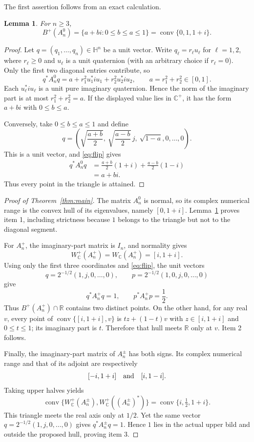 \documentclass[11pt]{article}
\newtheorem{lemma}[theorem]{Lemma}
\newcommand{\Hq}{\mathbb H}
\newcommand{\C}{\mathbb C}
\newcommand{\R}{\mathbb R}
\newcommand{\conv}{\operatorname{conv}}
\begin{document}
The first assertion follows from an exact calculation.

\begin{lemma}\label{lem:triangle}
For $n\geq3$,
\[
 B^+(A_n^0)=\{a+bi:0\leq b\leq a\leq1\}
             =\conv\{0,1,1+i\}.
\]
\end{lemma}

\begin{proof}
Let $q=(q_1,\ldots,q_n)\in\Hq^n$ be a unit vector.  Write
$q_\ell=r_\ell u_\ell$ for $\ell=1,2$, where $r_\ell\geq0$ and
$u_\ell$ is a unit quaternion (with an arbitrary choice if $r_\ell=0$).
Only the first two diagonal entries contribute, so
\[
 q^*A_n^0q
 =a+r_1^2u_1^*iu_1+r_2^2u_2^*iu_2,
 \qquad a=r_1^2+r_2^2\in[0,1].
\]
Each $u_\ell^*iu_\ell$ is a unit pure imaginary quaternion.  Hence the
norm of the imaginary part is at most $r_1^2+r_2^2=a$.  If the displayed
value lies in $\C^+$, it has the form $a+bi$ with $0\leq b\leq a$.

Conversely, take $0\leq b\leq a\leq1$ and define
\[
 q=\left(\sqrt{\frac{a+b}{2}},\
          \sqrt{\frac{a-b}{2}}\,j,\
          \sqrt{1-a},0,\ldots,0\right).
\]
This is a unit vector, and \eqref{eq:flip} gives
\begin{align*}
q^*A_n^0q
&=\frac{a+b}{2}(1+i)+\frac{a-b}{2}(1-i)\\
&=a+bi.
\end{align*}
Thus every point in the triangle is attained.
\end{proof}

\begin{proof}[Proof of Theorem~\ref{thm:main}]
The matrix $A_n^0$ is normal, so its complex numerical range is the convex
hull of its eigenvalues, namely $[0,1+i]$.  Lemma~\ref{lem:triangle} proves
item 1, including strictness because $1$ belongs to the triangle but not to
the diagonal segment.

For $A_n^+$, the imaginary-part matrix is $I_n$, and normality gives
\[
 W_{\C}^+(A_n^+)=W_{\C}(A_n^+)=[i,1+i].
\]
Using only the first three coordinates and \eqref{eq:flip}, the unit vectors
\[
 q=2^{-1/2}(1,j,0,\ldots,0),\qquad
 p=2^{-1/2}(1,0,j,0,\ldots,0)
\]
give
\[
 q^*A_n^+q=1,\qquad p^*A_n^+p=\frac12.
\]
Thus $B^+(A_n^+)\cap\R$ contains two distinct points.  On the other hand,
for any real $v$, every point of $\conv\{[i,1+i],v\}$ is
$t z+(1-t)v$ with $z\in[i,1+i]$ and $0\leq t\leq1$; its imaginary part is
$t$.  Therefore that hull meets $\R$ only at $v$.  Item 2 follows.

Finally, the imaginary-part matrix of $A_n^{\pm}$ has both signs.  Its
complex numerical range and that of its adjoint are respectively
\[
 [-i,1+i]\quad\hbox{and}\quad[i,1-i].
\]
Taking upper halves yields
\[
 \conv\{W_{\C}^+(A_n^{\pm}),W_{\C}^+((A_n^{\pm})^*)\}
 =\conv\{i,\tfrac12,1+i\}.
\]
This triangle meets the real axis only at $1/2$.  Yet the same vector
$q=2^{-1/2}(1,j,0,\ldots,0)$ gives
$q^*A_n^{\pm}q=1$.  Hence $1$ lies in the actual upper bild and outside the
proposed hull, proving item 3.
\end{proof}
\end{document}
